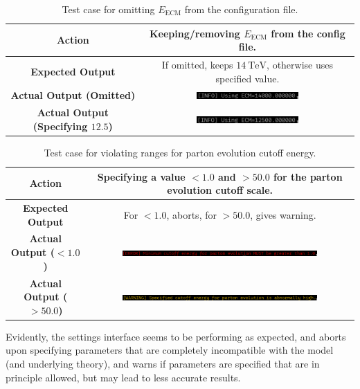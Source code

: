 \begin{table}[ht]
  \centering
  \begin{tabular}{|c|c|}
    \hline
    \textbf{Action} & Keeping/removing $E_{\mathrm{ECM}}$ from the config file. \\ \hline
    \textbf{Expected Output} & If omitted, keeps $\qty{14}{\TeV}$, otherwise uses specified value. \\ \hline
    \textbf{Actual Output (Omitted)} & \includegraphics[width=0.5\textwidth]{./res/gfx/settings-test1a.png} \\ \hline
    \textbf{Actual Output (Specifying $12.5$)} & \includegraphics[width=0.5\textwidth]{./res/gfx/settings-test1b.png} \\ \hline
  \end{tabular}
  \caption{Test case for omitting $E_{\mathrm{ECM}}$ from the configuration file.}
  \label{tbl:settings-test1}
\end{table}

\begin{table}[ht]
  \centering
  \begin{tabular}{|c|c|}
    \hline
    \textbf{Action} & Specifying a value $<1.0$ and $>50.0$ for the parton evolution cutoff scale. \\ \hline
    \textbf{Expected Output} & For $<1.0$, aborts, for $>50.0$, gives warning. \\ \hline
    \textbf{Actual Output ($<1.0$)} & \includegraphics[width=0.75\textwidth]{./res/gfx/settings-test2a.png} \\ \hline
    \textbf{Actual Output ($>50.0$)} & \includegraphics[width=0.75\textwidth]{./res/gfx/settings-test2b.png} \\ \hline
  \end{tabular}
  \caption{Test case for violating ranges for parton evolution cutoff energy.}
  \label{tbl:settings-test2}
\end{table}

Evidently, the settings interface seems to be performing as expected, and aborts upon specifying parameters that are completely incompatible with the model (and underlying theory), and warns if parameters are specified that are in principle allowed, but may lead to less accurate results.



